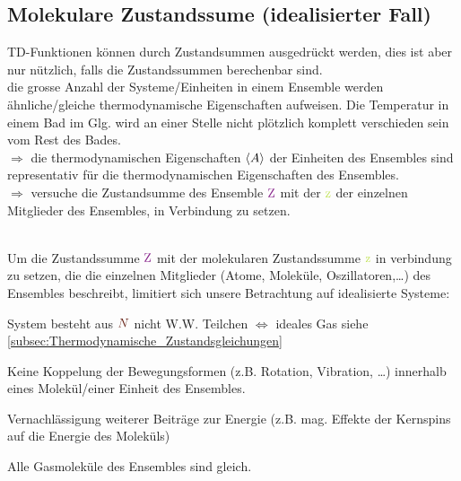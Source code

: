 \subsection{Molekulare Zustandssume (idealisierter Fall)}
\label{subsec:MolekulareZustandssume(idealisierterFall)}
\begin{sectionbox}\nospacing
  TD-Funktionen können durch Zustandsummen ausgedrückt werden, dies ist aber nur nützlich, falls die Zustandssummen berechenbar sind.\\
   die grosse Anzahl der Systeme/Einheiten in einem Ensemble werden ähnliche/gleiche thermodynamische Eigenschaften
  aufweisen. Die Temperatur in einem Bad im Glg. wird an einer Stelle nicht plötzlich komplett verschieden sein vom Rest des Bades.\\
  $\Rightarrow$ die thermodynamischen Eigenschaften $\left\langle A\right\rangle$ der Einheiten des Ensembles sind representativ für die thermodynamischen
  Eigenschaften des Ensembles.\\
  $\Rightarrow$ versuche die Zustandsumme des Ensemble $\Zz$ mit der  $\zz$ der einzelnen Mitglieder des
  Ensembles, in Verbindung zu setzen.
\end{sectionbox}
\begin{defnbox}\nospacing
  \begin{defn}\label{defn:idealSys}\leavevmode\\
  Um die Zustandssumme $\Zz$ mit der molekularen Zustandssumme $\zz$ in verbindung zu setzen, die die einzelnen Mitglieder (Atome, Moleküle,
  Oszillatoren,\ldots) des Ensembles beschreibt, limitiert sich unsere Betrachtung auf idealisierte Systeme:
    \begin{circlelist}
      \item System besteht aus $\idxN$ nicht W.W. Teilchen $\Longleftrightarrow$ ideales Gas siehe \cref{subsec:Thermodynamische_Zustandsgleichungen}\label{circl:keineWW}
      \item Keine Koppelung der Bewegungsformen (z.B. Rotation, Vibration, \ldots) innerhalb eines Molekül/einer Einheit des Ensembles.
      \label{circl:TrennungDerBewegungsformen}
      \item Vernachlässigung weiterer Beiträge zur Energie (z.B. mag. Effekte der Kernspins auf die Energie des Moleküls)
      \item Alle Gasmoleküle des Ensembles sind gleich.\label{circl:ident}
    \end{circlelist}
  \end{defn}
\end{defnbox}
